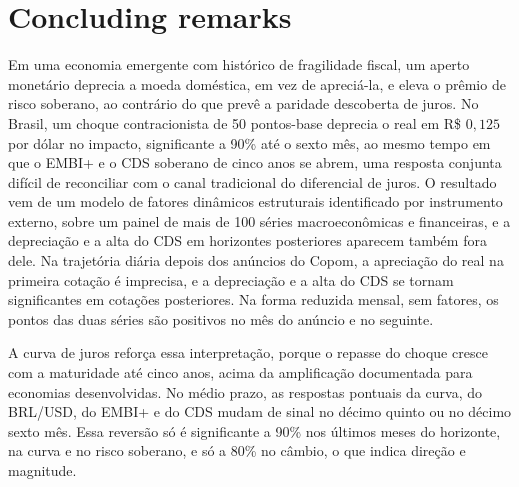 \documentclass[preprint,authoryear,review,12pt]{elsarticle}
\begin{document}
\section{Concluding remarks}
Em uma economia emergente com histórico de fragilidade fiscal, um aperto monetário deprecia a moeda doméstica, em vez de apreciá-la, e eleva o prêmio de risco soberano, ao contrário do que prevê a paridade descoberta de juros. No Brasil, um choque contracionista de 50 pontos-base deprecia o real em R\$ $0{,}125$ por dólar no impacto, significante a 90\% até o sexto mês, ao mesmo tempo em que o EMBI+ e o CDS soberano de cinco anos se abrem, uma resposta conjunta difícil de reconciliar com o canal tradicional do diferencial de juros. O resultado vem de um modelo de fatores dinâmicos estruturais identificado por instrumento externo, sobre um painel de mais de 100 séries macroeconômicas e financeiras, e a depreciação e a alta do CDS em horizontes posteriores aparecem também fora dele. Na trajetória diária depois dos anúncios do Copom, a apreciação do real na primeira cotação é imprecisa, e a depreciação e a alta do CDS se tornam significantes em cotações posteriores. Na forma reduzida mensal, sem fatores, os pontos das duas séries são positivos no mês do anúncio e no seguinte.

A curva de juros reforça essa interpretação, porque o repasse do choque cresce com a maturidade até cinco anos, acima da amplificação documentada para economias desenvolvidas. No médio prazo, as respostas pontuais da curva, do BRL/USD, do EMBI+ e do CDS mudam de sinal no décimo quinto ou no décimo sexto mês. Essa reversão só é significante a 90\% nos últimos meses do horizonte, na curva e no risco soberano, e só a 80\% no câmbio, o que indica direção e magnitude.

\end{document}
